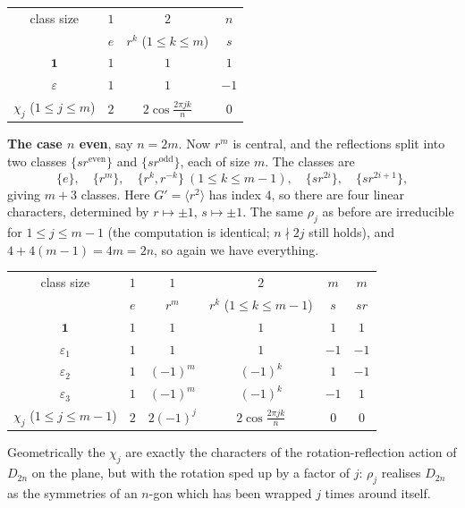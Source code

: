 \documentclass[a4paper]{scrartcl}
\newcommand{\gen}[1]{\langle #1 \rangle}
\begin{document}
\begin{center}
\renewcommand{\arraystretch}{1.35}
\setlength{\tabcolsep}{11pt}
\begin{tabular}{c|ccc}
\toprule
class size & $1$ & $2$ & $n$\\
 & $e$ & $r^k$ \; ($1\leq k\leq m$) & $s$\\
\midrule
$\mathbf 1$ & $1$ & $1$ & $1$\\
$\varepsilon$ & $1$ & $1$ & $-1$\\
$\chi_j$ \; ($1\leq j\leq m$) & $2$ & $2\cos\frac{2\pi jk}{n}$ & $0$\\
\bottomrule
\end{tabular}
\end{center}

\textbf{The case $n$ even}, say $n = 2m$. Now $r^m$ is central, and the reflections split into two classes $\{sr^{\text{even}}\}$ and $\{sr^{\text{odd}}\}$, each of size $m$. The classes are
$$\{e\},\quad \{r^m\},\quad \{r^k,r^{-k}\}\ (1\leq k\leq m-1),\quad \{sr^{2i}\},\quad\{sr^{2i+1}\},$$
giving $m+3$ classes. Here $G' = \gen{r^2}$ has index $4$, so there are four linear characters, determined by $r\mapsto\pm1$, $s\mapsto\pm1$. The same $\rho_j$ as before are irreducible for $1\leq j \leq m-1$ (the computation is identical; $n\nmid 2j$ still holds), and $4 + 4(m-1) = 4m = 2n$, so again we have everything.

\begin{center}
\renewcommand{\arraystretch}{1.35}
\setlength{\tabcolsep}{9pt}
\begin{tabular}{c|ccccc}
\toprule
class size & $1$ & $1$ & $2$ & $m$ & $m$\\
 & $e$ & $r^m$ & $r^k$ \; ($1\leq k \leq m-1$) & $s$ & $sr$\\
\midrule
$\mathbf 1$ & $1$ & $1$ & $1$ & $1$ & $1$\\
$\varepsilon_1$ & $1$ & $1$ & $1$ & $-1$ & $-1$\\
$\varepsilon_2$ & $1$ & $(-1)^m$ & $(-1)^k$ & $1$ & $-1$\\
$\varepsilon_3$ & $1$ & $(-1)^m$ & $(-1)^k$ & $-1$ & $1$\\
$\chi_j$ \; ($1\leq j\leq m-1$) & $2$ & $2(-1)^j$ & $2\cos\frac{2\pi jk}{n}$ & $0$ & $0$\\
\bottomrule
\end{tabular}
\end{center}

Geometrically the $\chi_j$ are exactly the characters of the rotation-reflection action of $D_{2n}$ on the plane, but with the rotation sped up by a factor of $j$: $\rho_j$ realises $D_{2n}$ as the symmetries of an $n$-gon which has been wrapped $j$ times around itself.
\end{document}
